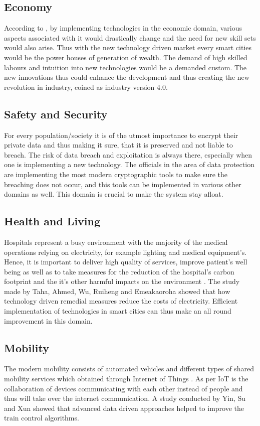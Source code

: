 \documentclass[sigconf]{acmart}
\begin{document}
 \subsection{Economy}
 According to \cite{lai2020review}, by implementing technologies in the economic domain, various aspects associated with it would drastically change and the need for new skill sets would also arise. Thus with the new technology driven market every smart cities would be the power houses of generation of wealth. The demand of high skilled labours and intuition into new technologies would be a demanded custom. The new innovations thus could enhance the development and thus creating the new revolution in industry, coined as industry version 4.0. 
  \subsection{Safety and Security}
 For every population/society it is of the utmost importance to encrypt their private data and thus making it sure, that it is  preserved and not liable to breach. The risk of data breach and exploitation is always there, especially when one is implementing a new technology. The officials in the area of data protection are implementing the most modern cryptographic tools to make sure the breaching does not occur, and this tools can be implemented in various other domains as well. This domain is crucial to make the system stay afloat.
 \subsection{Health and Living}
Hospitals represent a busy environment with the majority of the medical operations relying on electricity, for example lighting and medical equipment's. Hence, it is important to deliver high quality of services, improve patient's well being as well as to take measures for the reduction of the hospital’s carbon footprint and the it's other harmful impacts on the environment \cite{taha2018reduction}. The study made by Taha, Ahmed, Wu, Ruiheng and Emeakaoroha \cite{taha2018reduction} showed that how technology driven remedial measures reduce the costs of electricity. Efficient implementation of technologies in smart cities can thus make an all round improvement in this domain.
\subsection{Mobility}
The modern mobility consists of automated vehicles and different types of shared mobility services which obtained through Internet of Things \cite{lai2020review}. As per \cite{guerrero2015integration} IoT is the collaboration of devices communicating with each other instead of people and thus will take over the internet communication. A study conducted by Yin, Su and Xun \cite{yin2020data} showed that advanced data driven approaches helped to improve the train control algorithms. 
\end{document}
